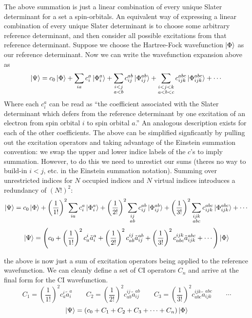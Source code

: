 \documentclass{article}
\newcommand{\lp}{\left(}
\newcommand{\rp}{\right)}
\begin{document}
The above summation is just a linear combination of every unique Slater determinant for a set a spin-orbitals. 
An equivalent way of expressing a linear combination of every unique Slater determinant is to choose some arbitrary reference determinant, 
    and then consider all possible excitations from that reference determinant. 
Suppose we choose the Hartree-Fock wavefunction  $\ket{\Phi}$ as our reference determinant.
Now we can write the wavefunction expansion above as 
\[ \ket{\Psi} = c_0 \ket{\Phi} + \sum_{ia} c_i^a \ket{\Phi_i^a} +  \sum_{ \substack{i < j \\ a < b}} c_{ij}^{ab} \ket{\Phi_{ij}^{ab}} + \sum_{ \substack{i < j < k \\ a < b < c }} c_{ijk}^{abc} \ket{\Phi_{ijk}^{abc}} + \cdots \]
Where each $c_i^a$ can be read as ``the coefficient associated with the Slater determinant which defers from the reference determinant 
    by one excitation of an electron from spin orbital $i$ to spin orbital $a$.''
An analogous description exists for each of the other coefficients.
The above can be simplified signficantly by pulling out the excitation operators and taking advantage of the Einstein summation convention: 
    we swap the upper and lower indice labels of the $c$'s to imply summation.
However, to do this we need to unrestict our sums (theres no way to build-in $i <j$, etc. in the Einstein summation notation). 
Summing over unrestricted indices for $N$ occupied indices and $N$ virtual indices introduces a redundancy of $(N!)^2$:
\[ \ket{\Psi} = c_0 \ket{\Phi} + \left(\frac{1}{1!}\right)^2 \sum_{ia} c_i^a \ket{\Phi_i^a} +  \left(\frac{1}{2!}\right)^2\sum_{ \substack{ij \\ ab}} c_{ij}^{ab} \ket{\Phi_{ij}^{ab}} + \left(\frac{1}{3!}\right)^2 \sum_{ \substack{ijk \\ abc}} c_{ijk}^{abc} \ket{\Phi_{ijk}^{abc}} + \cdots \]
\[ \ket{\Psi} = \left(c_0 + \left(\frac{1}{1!}\right)^2 c_a^i \tilde{a}_{i}^{a} +  \left(\frac{1}{2!}\right)^2c_{ab}^{ij} \tilde{a}_{ij}^{ab} + \left(\frac{1}{3!}\right)^2 c_{abc}^{ijk} \tilde{a}_{ijk}^{abc} + \cdots\right) \ket{\Phi}  \]

the above is now just a sum of excitation operators being applied to the reference wavefunction. 
We can cleanly define a set of CI operators $C_n$ and arrive at the final form for the CI wavefunction. 
\[ C_1 = \left(\frac{1}{1!}\right)^2 c_a^i \tilde{a}_{i}^{a} \quad \quad C_2 = \left(\frac{1}{2!}\right)^2c_{ab}^{ij} \tilde{a}_{ij}^{ab} \quad \quad C_3 = \left(\frac{1}{3!}\right)^2 c_{abc}^{ijk} \tilde{a}_{ijk}^{abc} \quad \quad \cdots  \]
\[ \ket{\Psi} = \lp c_0 + C_1 + C_2 + C_3 + \cdots + C_n \rp \ket{\Phi} \]
\end{document}
